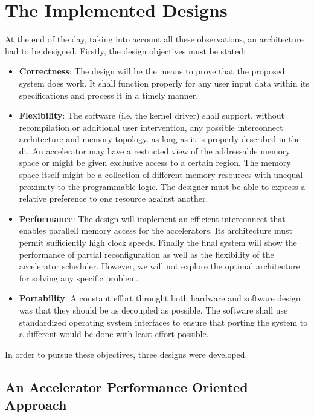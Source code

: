 \section{The Implemented Designs}

At the end of the day, taking into account all these observations,
an architecture had to be designed.
Firstly, the design objectives must be stated:

\begin{itemize}
\item	\textbf{Correctness}:
	The design will be the means to prove that the proposed system does work.
	It shall function properly for any user input data within its specifications
	and process it in a timely manner.
\item	\textbf{Flexibility}: 
	The software (i.e. the kernel driver) shall support,
	without recompilation or additional user intervention,
	any possible interconnect architecture and memory topology.
	as long as it is properly described in the \gls{dt}.
	An accelerator may have a restricted view of the addressable memory space
	or might be given exclusive access to a certain region.
	The memory space itself might be a collection of different memory resources
	with unequal proximity to the programmable logic. 
	The designer must be able to express a relative preference 
	to one resource against another.
\item	\textbf{Performance}:
	The design will implement an efficient interconnect that enables 
	parallell memory access for the accelerators. 
	Its architecture must permit sufficiently high clock speeds.
	Finally the final system will show the performance of partial reconfiguration
	as well as the flexibility of the accelerator scheduler.
	However, we will not explore the optimal architecture for solving any specific problem.
\item	\textbf{Portability}:
	A constant effort throught both hardware and software design was that they should be
	as decoupled as possible. The software shall use standardized operating system
	interfaces to ensure that porting the system to a different would be done with
	least effort possible.
\end{itemize}

In order to pursue these objectives, three designs were developed.

\subsection{An Accelerator Performance Oriented Approach}

